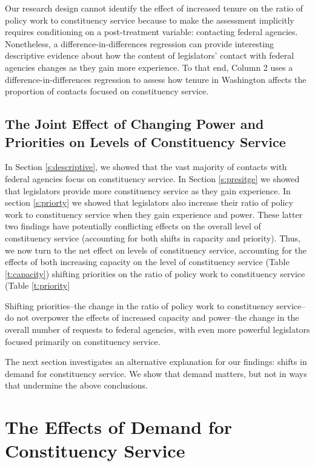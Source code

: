 \documentclass[12pt]{article}
\begin{document}
Our research design cannot identify the effect of increased tenure on the ratio of policy work to constituency service because to make the assessment implicitly requires conditioning on a post-treatment variable: contacting federal agencies. Nonetheless, a difference-in-differences regression can provide interesting descriptive evidence about how the content of legislators' contact with federal agencies changes as they gain more experience. To that end, Column 2 uses a difference-in-differences regression to assess how tenure in Washington affects the proportion of contacts focused on constituency service. 


\subsection{The Joint Effect of Changing Power and Priorities on Levels of Constituency Service}\label{s:joint} 

In Section \ref{s:descriptive}, we showed that the vast majority of contacts with federal agencies focus on constituency service. In Section \ref{s:presitge} we showed that legislators provide more constituency service as they gain experience. In section \ref{s:priorty} we showed that legislators also increase their ratio of policy work to constituency service when they gain experience and power. These latter two findings have potentially conflicting effects on the overall level of constituency service (accounting for both shifts in capacity and priority). Thus, we now turn to the net effect on levels of constituency service, accounting for the effects of both increasing capacity on the level of constituency service (Table \ref{t:capacity}) shifting priorities on the ratio of policy work to constituency service (Table \ref{t:priority}




Shifting priorities--the change in the ratio of policy work to constituency service--do not overpower the effects of increased capacity and power--the change in the overall number of requests to federal agencies, with even more powerful legislators focused primarily on constituency service. 

The next section investigates an alternative explanation for our findings: shifts in demand for constituency service. We show that demand matters, but not in ways that undermine the above conclusions.


\section{The Effects of Demand for Constituency Service}\label{s:demand} 
\end{document}
